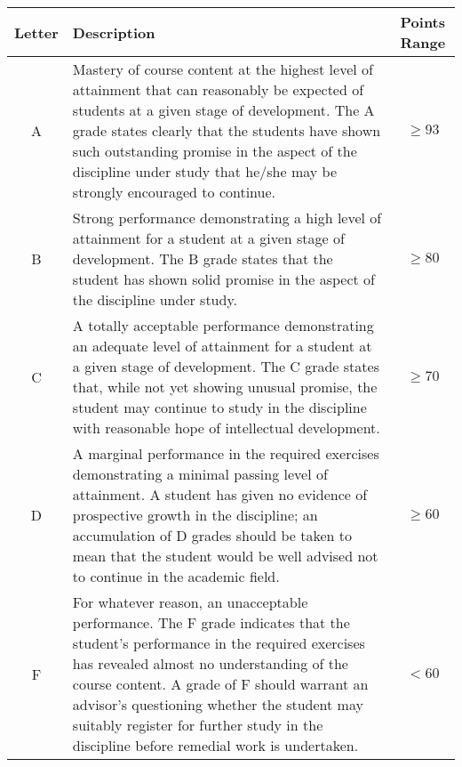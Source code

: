 \documentclass[11pt]{article}
\begin{document}
\begin{center}
\begin{tabular}{c|m{35em}|c}
Letter & Description & Points Range \\
\hline
A & Mastery of course content at the highest level of attainment that can reasonably be expected of students at a given stage of development. The A grade states clearly that the students have shown such outstanding promise in the aspect of the discipline under study that he/she may be strongly encouraged to continue.  & $\geq 93$ \\
\hline
B & Strong performance demonstrating a high level of attainment for a student at a given stage of development. The B grade states that the student has shown solid promise in the aspect of the discipline under study.  & $\geq 80$ \\
\hline
C & A totally acceptable performance demonstrating an adequate level of attainment for a student at a given stage of development. The C grade states that, while not yet showing unusual promise, the student may continue to study in the discipline with reasonable hope of intellectual development.  & $\geq 70$ \\
\hline
D & A marginal performance in the required exercises demonstrating a minimal passing level of attainment. A student has given no evidence of prospective growth in the discipline; an accumulation of D grades should be taken to mean that the student would be well advised not to continue in the academic field.  & $\geq 60$ \\
\hline
F & For whatever reason, an unacceptable performance. The F grade indicates that the student’s performance in the required exercises has revealed almost no understanding of the course content. A grade of F should warrant an advisor’s questioning whether the student may suitably register for further study in the discipline before remedial 
work is undertaken. & $<60$\\
\end{tabular}
\end{center} 
\end{document}
